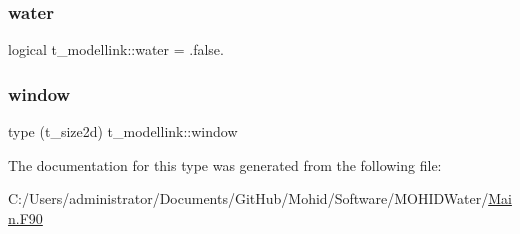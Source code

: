 \subsubsection{\texorpdfstring{water}{water}}
{\footnotesize\ttfamily logical t\+\_\+modellink\+::water = .false.}

\mbox{\label{structt__modellink_ae56cb30e76665a2ca2d964852f534e79}} 
\subsubsection{\texorpdfstring{window}{window}}
{\footnotesize\ttfamily type (t\+\_\+size2d) t\+\_\+modellink\+::window}



The documentation for this type was generated from the following file\+:\begin{DoxyCompactItemize}
\item 
C\+:/\+Users/administrator/\+Documents/\+Git\+Hub/\+Mohid/\+Software/\+M\+O\+H\+I\+D\+Water/\mbox{\hyperlink{_main_8_f90}{Main.\+F90}}\end{DoxyCompactItemize}
